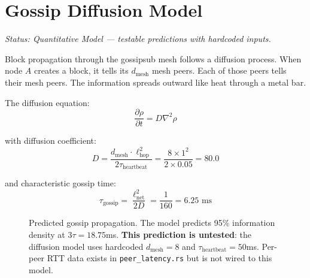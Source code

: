 \documentclass[11pt,a4paper]{article}
\begin{document}
\section{Gossip Diffusion Model}

\emph{Status: \textcolor{hardcoded}{Quantitative Model} --- testable predictions with hardcoded inputs.}

Block propagation through the gossipsub mesh follows a diffusion process. When node $A$ creates a block, it tells its $d_{\text{mesh}}$ mesh peers. Each of those peers tells their mesh peers. The information spreads outward like heat through a metal bar.

The diffusion equation:
\begin{equation}
\frac{\partial \rho}{\partial t} = D \nabla^2 \rho
\end{equation}

with diffusion coefficient:
\begin{equation}
D = \frac{d_{\text{mesh}} \cdot \ell_{\text{hop}}^2}{2\tau_{\text{heartbeat}}} = \frac{8 \times 1^2}{2 \times 0.05} = 80.0
\end{equation}

and characteristic gossip time:
\begin{equation}
\tau_{\text{gossip}} = \frac{\ell_{\text{net}}^2}{2D} = \frac{1}{160} = 6.25 \text{ ms}
\end{equation}

\begin{figure}[H]
\centering
{}
\caption{Predicted gossip propagation. The model predicts 95\% information density at $3\tau = 18.75$ms. \textbf{This prediction is untested}: the diffusion model uses hardcoded $d_{\text{mesh}} = 8$ and $\tau_{\text{heartbeat}} = 50$ms. Per-peer RTT data exists in \texttt{peer\_latency.rs} but is not wired to this model.}
\label{fig:diffusion}
\end{figure}
\end{document}
